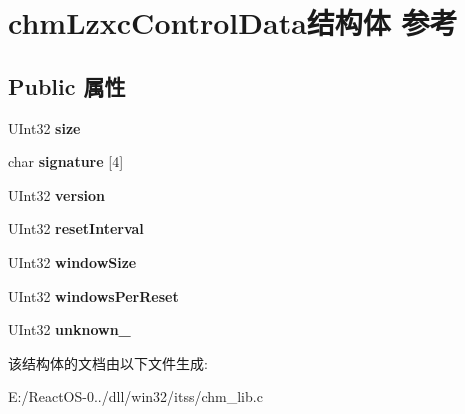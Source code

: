\hypertarget{structchm_lzxc_control_data}{}\section{chm\+Lzxc\+Control\+Data结构体 参考}
\label{structchm_lzxc_control_data}
\subsection*{Public 属性}
\begin{DoxyCompactItemize}
\item 
\mbox{\label{structchm_lzxc_control_data_adea24fdf87e63909a2ef500b3bba5010}} 
U\+Int32 {\bfseries size}
\item 
\mbox{\label{structchm_lzxc_control_data_ac8945d74c372bc4b048476b81fee30cf}} 
char {\bfseries signature} \mbox{[}4\mbox{]}
\item 
\mbox{\label{structchm_lzxc_control_data_aa2287c1290de04396cb2c13657d5a0cf}} 
U\+Int32 {\bfseries version}
\item 
\mbox{\label{structchm_lzxc_control_data_a6a11354dcd20a4ddf9256d4fbe56787d}} 
U\+Int32 {\bfseries reset\+Interval}
\item 
\mbox{\label{structchm_lzxc_control_data_a7ae81ceb6b489f7c7d0a810533ce20ec}} 
U\+Int32 {\bfseries window\+Size}
\item 
\mbox{\label{structchm_lzxc_control_data_a9149264acf770344b2500e013c9f9b0b}} 
U\+Int32 {\bfseries windows\+Per\+Reset}
\item 
\mbox{\label{structchm_lzxc_control_data_aad7ec9d33aa5cd0048c0a3df4e5666b2}} 
U\+Int32 {\bfseries unknown\+\_}
\end{DoxyCompactItemize}


该结构体的文档由以下文件生成\+:\begin{DoxyCompactItemize}
\item 
E\+:/\+React\+O\+S-\/0../dll/win32/itss/chm\+\_\+lib.\+c\end{DoxyCompactItemize}
